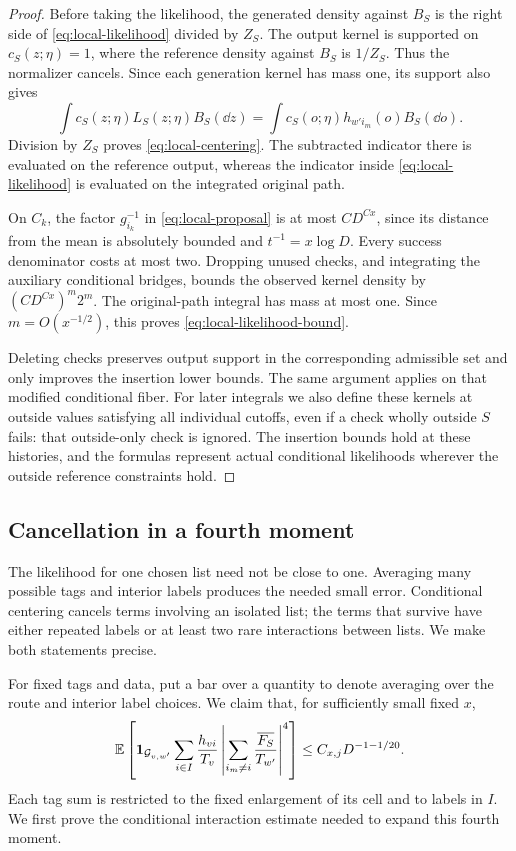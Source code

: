 \begin{proof}
Before taking the likelihood, the generated density against $B_S$
is the right side of \eqref{eq:local-likelihood} divided by $Z_S$.
The output kernel is supported on $c_S(z;\eta)=1$, where the reference
density against $B_S$ is $1/Z_S$.  Thus the normalizer cancels.
Since each generation kernel has mass one, its support also gives
\[
 \int c_S(z;\eta)L_S(z;\eta)B_S(\dd z)
       =\int c_S(o;\eta)h_{w'i_m}(o)B_S(\dd o).
\]
Division by $Z_S$ proves \eqref{eq:local-centering}.  The subtracted
indicator there is evaluated on the reference output, whereas the
indicator inside \eqref{eq:local-likelihood} is evaluated on the
integrated original path.

On $C_k$, the factor $g_{i_k}^{-1}$ in
\eqref{eq:local-proposal} is at most $CD^{Cx}$, since its distance
from the mean is absolutely bounded and $t^{-1}=x\log D$.
Every success denominator costs at most two.  Dropping unused checks,
and integrating the auxiliary conditional bridges, bounds the observed
kernel density by $(CD^{Cx})^m2^m$.  The original-path integral has
mass at most one.  Since $m=O(x^{-1/2})$, this proves
\eqref{eq:local-likelihood-bound}.

Deleting checks preserves output support in the corresponding
admissible set and only improves the insertion lower bounds.  The
same argument applies on that modified conditional fiber.  For later
integrals we also define these kernels at outside values satisfying
all individual cutoffs, even if a check wholly outside $S$ fails:
that outside-only check is ignored.  The insertion bounds hold at
these histories, and the formulas represent actual conditional
likelihoods wherever the outside reference constraints hold.
\end{proof}

\subsection{Cancellation in a fourth moment}

The likelihood for one chosen list need not be close to one.  Averaging
many possible tags and interior labels produces the needed small
error.  Conditional centering cancels terms involving an isolated
list; the terms that survive have either repeated labels or at least
two rare interactions between lists.  We make both statements precise.

For fixed tags and data, put a bar over a quantity to denote averaging
over the route and interior label choices.  We claim that, for
sufficiently small fixed $x$,
\begin{equation}\label{eq:local-centered-fourth}
 \mathbb E\left[\mathbf 1_{\mathcal G_{v,w'}}
       \sum_{i\in I}\frac{h_{vi}}{T_v}
       \left|\sum_{i_m\ne i}\frac{\overline{F_S}}{T_{w'}}\right|^4
       \right]\le C_{x,j}D^{-1-1/20}.
\end{equation}
Each tag sum is restricted to the fixed enlargement of its cell and
to labels in $I$.  We first prove the conditional interaction
estimate needed to expand this fourth moment.

